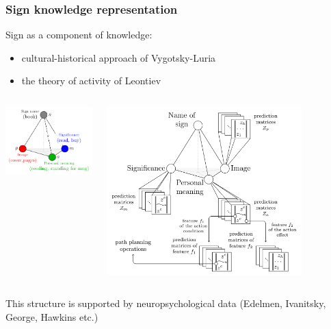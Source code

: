 \documentclass[default]{beamer}
\begin{document}
	\begin{frame}
		\frametitle{Sign knowledge representation}
		
		Sign as a component of knowledge:
		\begin{itemize}
			\item cultural-historical approach of Vygotsky-Luria
			\item the theory of activity of Leontiev
		\end{itemize}
		
		\begin{columns}
			\begin{column}{0.4\textwidth}
				\centering
				\includegraphics[width=\textwidth]{signs/sign_colored_rita.pdf}
			\end{column}
			\begin{column}{0.6\textwidth}
				\centering
				\includegraphics[width=0.8\textwidth]{signs/sign_kr.png}
			\end{column}
		\end{columns}
		
		This structure is supported by neuropsychological data (Edelmen, Ivanitsky, George, Hawkins etc.)
		
	\end{frame}
\end{document}
